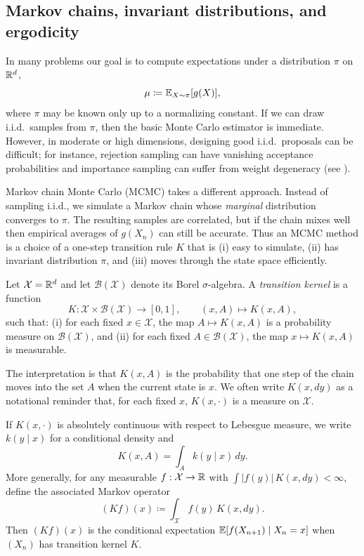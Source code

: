 \subsection{Markov chains, invariant distributions, and ergodicity}
\label{subsec:markov-chains-kernels}

In many problems our goal is to compute expectations under a distribution $\pi$ on $\mathbb{R}^d$,
\[
\mu \coloneqq \mathbb{E}_{X\sim \pi}[g(X)],
\]
where $\pi$ may be known only up to a normalizing constant.
If we can draw i.i.d.\ samples from $\pi$, then the basic Monte Carlo estimator is immediate.
However, in moderate or high dimensions, designing good i.i.d.\ proposals can be difficult; for instance, rejection sampling can have vanishing acceptance probabilities and importance sampling can suffer from weight degeneracy (see ).

Markov chain Monte Carlo (MCMC) takes a different approach.
Instead of sampling i.i.d., we simulate a Markov chain whose \emph{marginal} distribution converges to $\pi$.
The resulting samples are correlated, but if the chain mixes well then empirical averages of $g(X_n)$ can still be accurate.
Thus an MCMC method is a choice of a one-step transition rule $K$ that is (i) easy to simulate, (ii) has invariant distribution $\pi$, and (iii) moves through the state space efficiently.

\begin{definition}
Let $\mathcal{X}=\mathbb{R}^d$ and let $\mathcal{B}(\mathcal{X})$ denote its Borel $\sigma$-algebra.
A \emph{transition kernel} is a function
\[
K:\mathcal{X}\times\mathcal{B}(\mathcal{X})\to[0,1],\qquad (x,A)\mapsto K(x,A),
\]
such that:
(i) for each fixed $x\in\mathcal{X}$, the map $A\mapsto K(x,A)$ is a probability measure on $\mathcal{B}(\mathcal{X})$, and
(ii) for each fixed $A\in\mathcal{B}(\mathcal{X})$, the map $x\mapsto K(x,A)$ is measurable.
\end{definition}

The interpretation is that $K(x,A)$ is the probability that one step of the chain moves into the set $A$ when the current state is $x$.
We often write $K(x,dy)$ as a notational reminder that, for each fixed $x$, $K(x,\cdot)$ is a measure on $\mathcal{X}$.

If $K(x,\cdot)$ is absolutely continuous with respect to Lebesgue measure, we write $k(y\mid x)$ for a conditional density and
\[
K(x,A) = \int_A k(y\mid x)\,dy.
\]
More generally, for any measurable $f:\mathcal{X}\to\mathbb{R}$ with $\int |f(y)|\,K(x,dy)<\infty$, define the associated Markov operator
\[
(Kf)(x) \coloneqq \int_{\mathcal{X}} f(y)\,K(x,dy).
\]
Then $(Kf)(x)$ is the conditional expectation $\mathbb{E}[f(X_{n+1})\mid X_n=x]$ when $(X_n)$ has transition kernel $K$.

